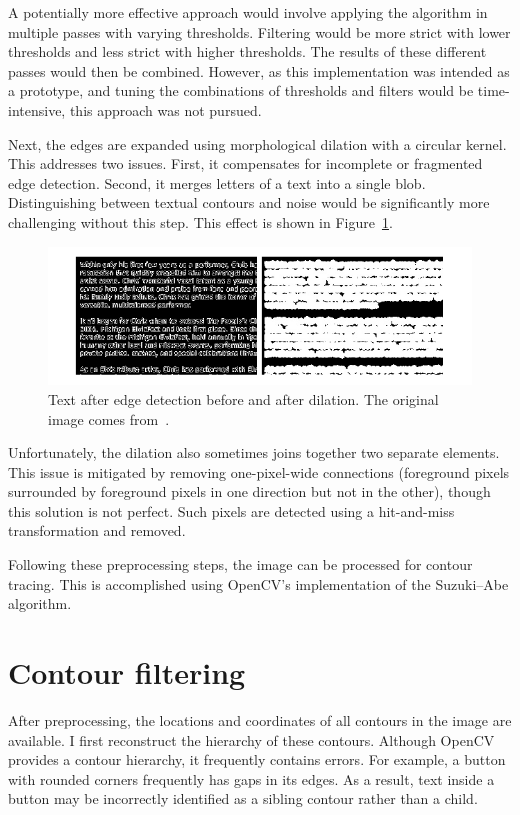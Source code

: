 \documentclass[
  digital,     %
  oneside,     %
  nosansbold,  %
  nocolorbold, %
  lof,         %
  lot,         %
]{fithesis4}
\begin{document}
A potentially more effective approach would involve applying the algorithm in multiple passes with varying thresholds. Filtering would be more strict with lower thresholds and less strict with higher thresholds. The results of these different passes would then be combined. However, as this implementation was intended as a prototype, and tuning the combinations of thresholds and filters would be time-intensive, this approach was not pursued.

Next, the edges are expanded using morphological dilation with a circular kernel. This addresses two issues. First, it compensates for incomplete or fragmented edge detection. Second, it merges letters of a text into a single blob. Distinguishing between textual contours and noise would be significantly more challenging without this step. This effect is shown in Figure~\ref{fig:dilation}.

\begin{figure}
    \centering
    \includegraphics[width=1\linewidth]{diagrams/dilation.pdf}
    \caption{Text after edge detection before and after dilation. The original image comes from~\cite{aydos2020}.}
    \label{fig:dilation}
\end{figure}

Unfortunately, the dilation also sometimes joins together two separate elements. This issue is mitigated by removing one-pixel-wide connections (foreground pixels surrounded by foreground pixels in one direction but not in the other), though this solution is not perfect. Such pixels are detected using a hit-and-miss transformation and removed.

Following these preprocessing steps, the image can be processed for contour tracing. This is accomplished using OpenCV's implementation of the Suzuki–Abe algorithm.

\section{Contour filtering}

After preprocessing, the locations and coordinates of all contours in the image are available. I first reconstruct the hierarchy of these contours. Although OpenCV provides a contour hierarchy, it frequently contains errors. For example, a button with rounded corners frequently has gaps in its edges. As a result, text inside a button may be incorrectly identified as a sibling contour rather than a child.
\end{document}
